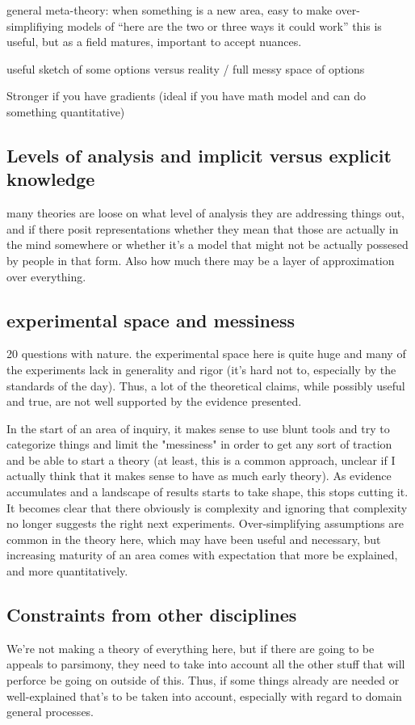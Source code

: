 \documentclass[]{article}
\begin{document}
general meta-theory: when something is a new area, easy to make over-simplifiying models of “here are the two or three ways it could work” this is useful, but as a field matures, important to accept nuances.

useful sketch of some options versus reality / full messy space of options

Stronger if you have gradients (ideal if you have math model and can do something quantitative)

\subsection{ Levels of analysis and implicit versus explicit knowledge}
many theories are loose on what level of analysis they are addressing things out, and if there posit representations whether they mean that those are actually in the mind somewhere or whether it's a model that might not be actually possesed by people in that form. Also how much there may be a layer of approximation over everything. 

\subsection{experimental space and messiness}
20 	questions with nature. 
the experimental space here is quite huge and many of the experiments lack in generality and rigor (it's hard not to, especially by the standards of the day). Thus, a lot of the theoretical claims, while possibly useful and true, are not well supported by the evidence presented. 

In the start of an area of inquiry, it makes sense to use blunt tools and try to categorize things and limit the "messiness" in order to get any sort of traction and be able to start a theory (at least, this is a common approach, unclear if I actually think that it makes sense to have as much early theory). As evidence accumulates and a landscape of results starts to take shape, this stops cutting it. It becomes clear that there obviously is complexity and ignoring that complexity no longer suggests the right next experiments. Over-simplifying assumptions are common in the theory here, which may have been useful and necessary, but increasing maturity of an area comes with expectation that more be explained, and more quantitatively. 

\subsection{Constraints from other disciplines}
We're not making a theory of everything here, but if there are going to be appeals to parsimony, they need to take into account all the other stuff that will perforce be going on outside of this. Thus, if some things already are needed or well-explained that's to be  taken into account, especially with regard to domain general processes. 
\end{document}

